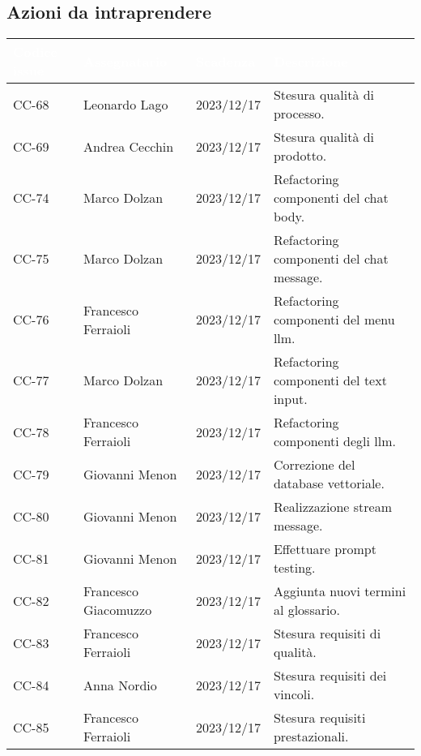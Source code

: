 \subsection{Azioni da intraprendere}
{
    \setlength{\tabcolsep}{10pt}
    \renewcommand{\arraystretch}{1.5}
    \begin{xltabular}{\textwidth}{| l | l | l | X |}
        \hline
        \textbf{\textcolor{white}{Codice issue}} & \textbf{\textcolor{white}{Assegnatario}} & \textbf{\textcolor{white}{Scadenza}} & \textbf{\textcolor{white}{Descrizione}} \\
        \endhead
        \hline
        CC-68 & Leonardo Lago & 2023/12/17 & Stesura qualità di processo. \\
        \hline
        CC-69 & Andrea Cecchin & 2023/12/17 & Stesura qualità di prodotto. \\
        \hline
        CC-74 & Marco Dolzan & 2023/12/17 & Refactoring componenti del chat body.  \\
        \hline
        CC-75 & Marco Dolzan & 2023/12/17 & Refactoring componenti del chat message. \\
        \hline
        CC-76 & Francesco Ferraioli & 2023/12/17 & Refactoring componenti del menu llm.\\
        \hline
        CC-77 & Marco Dolzan & 2023/12/17 & Refactoring componenti del text input.\\
        \hline
        CC-78 & Francesco Ferraioli & 2023/12/17 & Refactoring componenti degli llm.\\
        \hline
        CC-79 & Giovanni Menon & 2023/12/17 & Correzione del database vettoriale. \\
        \hline
        CC-80 & Giovanni Menon & 2023/12/17 & Realizzazione stream message. \\
        \hline
        CC-81 & Giovanni Menon & 2023/12/17 & Effettuare prompt testing. \\
        \hline
        CC-82 & Francesco Giacomuzzo & 2023/12/17 & Aggiunta nuovi termini al glossario. \\ 
        \hline
        CC-83 & Francesco Ferraioli & 2023/12/17 & Stesura requisiti di qualità. \\
        \hline
        CC-84 & Anna Nordio & 2023/12/17 & Stesura requisiti dei vincoli. \\
        \hline
        CC-85 & Francesco Ferraioli & 2023/12/17 & Stesura requisiti prestazionali. \\

\end{xltabular}}
